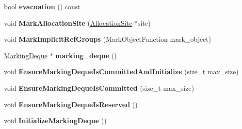 \begin{DoxyCompactItemize}
\item 
bool {\bfseries evacuation} () const \hypertarget{classv8_1_1internal_1_1_mark_compact_collector_a556ca163888b386dcda2dd00d9fcd3bf}{}\label{classv8_1_1internal_1_1_mark_compact_collector_a556ca163888b386dcda2dd00d9fcd3bf}

\item 
void {\bfseries Mark\+Allocation\+Site} (\hyperlink{classv8_1_1internal_1_1_allocation_site}{Allocation\+Site} $\ast$site)\hypertarget{classv8_1_1internal_1_1_mark_compact_collector_a0388cfe4cb94a2dcf3e42c7a9aff316e}{}\label{classv8_1_1internal_1_1_mark_compact_collector_a0388cfe4cb94a2dcf3e42c7a9aff316e}

\item 
void {\bfseries Mark\+Implicit\+Ref\+Groups} (Mark\+Object\+Function mark\+\_\+object)\hypertarget{classv8_1_1internal_1_1_mark_compact_collector_af53175013c64a536382af5fb456279d4}{}\label{classv8_1_1internal_1_1_mark_compact_collector_af53175013c64a536382af5fb456279d4}

\item 
\hyperlink{classv8_1_1internal_1_1_marking_deque}{Marking\+Deque} $\ast$ {\bfseries marking\+\_\+deque} ()\hypertarget{classv8_1_1internal_1_1_mark_compact_collector_a1263b6061653bb81b2bb4e6fd515172f}{}\label{classv8_1_1internal_1_1_mark_compact_collector_a1263b6061653bb81b2bb4e6fd515172f}

\item 
void {\bfseries Ensure\+Marking\+Deque\+Is\+Committed\+And\+Initialize} (size\+\_\+t max\+\_\+size)\hypertarget{classv8_1_1internal_1_1_mark_compact_collector_a41af45503da265caf00cc23fadf01b17}{}\label{classv8_1_1internal_1_1_mark_compact_collector_a41af45503da265caf00cc23fadf01b17}

\item 
void {\bfseries Ensure\+Marking\+Deque\+Is\+Committed} (size\+\_\+t max\+\_\+size)\hypertarget{classv8_1_1internal_1_1_mark_compact_collector_a20a68557b42a1b5ff5b8fac953b4ee25}{}\label{classv8_1_1internal_1_1_mark_compact_collector_a20a68557b42a1b5ff5b8fac953b4ee25}

\item 
void {\bfseries Ensure\+Marking\+Deque\+Is\+Reserved} ()\hypertarget{classv8_1_1internal_1_1_mark_compact_collector_a031b063a1e663e4c48c91538578d6f03}{}\label{classv8_1_1internal_1_1_mark_compact_collector_a031b063a1e663e4c48c91538578d6f03}

\item 
void {\bfseries Initialize\+Marking\+Deque} ()\hypertarget{classv8_1_1internal_1_1_mark_compact_collector_a03820e9931b2abcd7d1eefa179e84926}{}\label{classv8_1_1internal_1_1_mark_compact_collector_a03820e9931b2abcd7d1eefa179e84926}


\end{DoxyCompactItemize}

